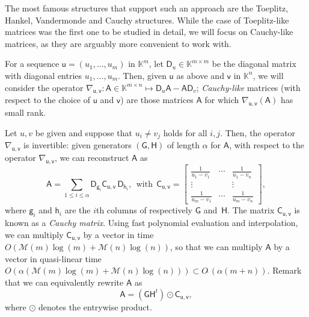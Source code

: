 \documentclass{sig-alternate}
\newcommand{\vg}{\ensuremath{\mathsf{g}}}
\newcommand{\vh}{\ensuremath{\mathsf{h}}}
\newcommand{\vu}{\ensuremath{\mathsf{u}}}
\newcommand{\vv}{\ensuremath{\mathsf{v}}}
\newcommand{\mA}{\ensuremath{\mathsf{A}}}
\newcommand{\mC}{\ensuremath{\mathsf{C}}}
\newcommand{\mD}{\ensuremath{\mathsf{D}}}
\newcommand{\mG}{\ensuremath{\mathsf{G}}}
\newcommand{\mH}{\ensuremath{\mathsf{H}}}
\newcommand{\mM}{\ensuremath{\mathsf{M}}}
\newcommand{\mN}{\ensuremath{\mathsf{N}}}
\newcommand{\mZ}{\ensuremath{\mathsf{Z}}}
\newcommand{\K}{\ensuremath{\mathbb{K}}}
\newcommand{\M}{\ensuremath{\mathscr{M}}}
\newcommand{\Otilde}[1]{\ensuremath{O\tilde{~}(#1)}} %
\begin{document}
The most famous structures that support such an approach are the
Toeplitz, Hankel, Vandermonde and Cauchy structures. While the case of
Toeplitz-like matrices was the first one to be studied in detail, we
will focus on Cauchy-like matrices, as they are arguably more
convenient to work with.


For a sequence $\vu=(u_1,\dots,u_m)$ in $\K^m$, let $\mD_u \in
\K^{m\times m}$ be the diagonal matrix with diagonal entries
$u_1,\dots,u_m$. Then, given $\vu$ as above and $\vv$ in $\K^n$, we will
consider the operator $\nabla_{\vu,\vv}: \mA \in \K^{m\times n} \mapsto \mD_u
\mA - \mA \mD_v$; {\em Cauchy-like} matrices (with respect to the
choice of $\vu$ and $\vv$) are those matrices $\mA$ for which
$\nabla_{\vu,\vv}(\mA)$ has small rank.

Let $u,v$ be given and suppose that $u_i \ne v_j$ holds for all
$i,j$. Then, the operator $\nabla_{\vu,\vv}$ is invertible: given
generators $(\mG,\mH)$ of length $\alpha$ for $\mA$, with respect to
the operator $\nabla_{\vu,\vv}$, we can reconstruct $\mA$ as
\begin{equation}\label{eq:recA}
\mA = \sum_{1 \le i \le \alpha}
\mD_{\vg_i} 
\mC_{\vu,\vv}\,\mD_{\vh_i},\ \ \text{with}\ \ 
\mC_{\vu,\vv}=\begin{bmatrix}
\frac 1{u_1-v_1} & \cdots & \frac 1{u_1-v_n}\\
\vdots & & \vdots \\
\frac 1{u_m-v_1} & \cdots & \frac 1{u_m-v_n}
\end{bmatrix}, 
\end{equation}
where $\vg_i$ and $\vh_i$ are the $i$th columns of respectively $\mG$
and~$\mH$. The matrix $\mC_{\vu,\vv}$ is known as a {\em Cauchy
  matrix}. Using fast polynomial evaluation and interpolation, we can
multiply $\mC_{\vu,\vv}$ by a vector in time
$O(\M(m)\log(m)+\M(n)\log(n))$, so that we can multiply $\mA$ by a
vector in quasi-linear time $O(\alpha( \M(m)\log(m) +
\M(n)\log(n)))\subset \Otilde{\alpha (m+n)}$. Remark that we can
equivalently rewrite $\mA$ as
\begin{equation}\label{eq:recA2}
\mA= (\mG \mH^t) \odot \mC_{\vu,\vv},
\end{equation}
where $\odot$ denotes the entrywise product.
\end{document}
